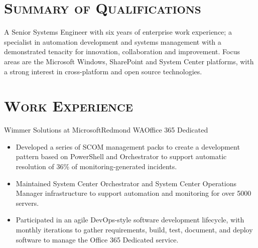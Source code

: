 \documentclass[11pt,letter,roman]{moderncv}
\begin{document}
\makecvtitle{}
\vspace{-\baselineskip}

\section{\textsc{Summary of Qualifications}}
A Senior Systems Engineer with six years of enterprise work
experience; a specialist in automation development and systems management
with a demonstrated tenacity for innovation, collaboration and improvement.
Focus areas are the Microsoft Windows, SharePoint and System Center platforms,
with a strong interest in cross-platform and open source technologies.

\section{\textsc{Work Experience}}
{Wimmer Solutions at Microsoft}{Redmond WA}{Office 365 Dedicated}{%
  \begin{itemize}
    \item Developed a series of SCOM management packs to create a development
      pattern based on PowerShell and Orchestrator to support automatic
      resolution of 36\% of monitoring-generated incidents.
    \item Maintained System Center Orchestrator and System Center Operations
      Manager infrastructure to support automation and monitoring for over
      5000 servers.
    \item Participated in an agile DevOps-style software development
      lifecycle, with monthly iterations to gather requirements, build, test,
      document, and deploy software to manage the Office 365 Dedicated service.
  \end{itemize}
}
\end{document}
